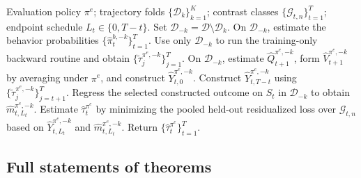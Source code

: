 \documentclass[opre,nonblindrev]{informs4}
\providecommand{\cD}{\mathcal D}
\providecommand{\cG}{\mathcal G}
\newcommand{\blipadv}{\tau}
\begin{document}
\begin{algorithm*}[t!]
\caption{Dynamic Residualized Difference-of-Q Evaluation}
\label{alg-dyn-blipadv-evaluation}
\begin{algorithmic}[1]
\REQUIRE Evaluation policy $\pi^e$; trajectory folds
$\{\cD_k\}_{k=1}^K$; contrast classes $\{\cG_{t,n}\}_{t=1}^T$;
endpoint schedule $L_t\in\{0,T-t\}$.
\STATE Set $\cD_{-k}=\cD\setminus\cD_k$.
\STATE On $\cD_{-k}$, estimate the behavior probabilities
$\{\hat\pi_t^{b,-k}\}_{t=1}^T$.
\STATE Use only $\cD_{-k}$ to run the training-only backward routine and
obtain $\{\widetilde\tau_j^{\pi^e,-k}\}_{j=1}^T$.
\ENDIF
{}
\STATE On $\cD_{-k}$, estimate $\hat Q_{t+1}^{\pi^e,-k}$, form
$\hat V_{t+1}^{\pi^e,-k}$ by averaging under $\pi^e$, and construct
$\hat Y_{t,0}^{\pi^e,-k}$.
\ENDIF
{}
\STATE Construct $\hat Y_{t,T-t}^{\pi^e,-k}$ using
$\{\widetilde\tau_j^{\pi^e,-k}\}_{j=t+1}^T$.
\ENDIF
\STATE Regress the selected constructed outcome on $S_t$ in $\cD_{-k}$
to obtain $\hat m_{t,L_t}^{\pi^e,-k}$.
\ENDFOR
\ENDFOR
{}
\STATE Estimate $\hat\blipadv_t^{\pi^e}$ by minimizing the pooled
held-out residualized loss over $\cG_{t,n}$ based on
$\hat Y_{t,L_t}^{\pi^e,-k}$ and $\hat m_{t,L_t}^{\pi^e,-k}$.
\ENDFOR
\STATE Return $\{\hat\blipadv_t^{\pi^e}\}_{t=1}^T$.
\end{algorithmic}
\end{algorithm*}

\clearpage
\subsection{Full statements of theorems}\label{apx-full-statements}
\end{document}
